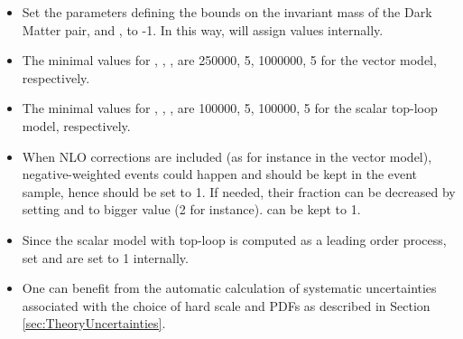 \begin{itemize}
\item Set the parameters defining the bounds on the invariant mass of the Dark Matter pair, \masslow and \masshigh, to -1. In this way, \powheg will assign values internally. 
\item The minimal values for \ncallOne, \itmxOne, \ncallTwo, \itmxTwo are 250000, 5, 1000000, 5 for the vector model, respectively.
\item The minimal values for \ncallOne, \itmxOne, \ncallTwo, \itmxTwo are 100000, 5, 100000, 5 for the scalar top-loop model, respectively.
\item When NLO corrections are included (as for instance in the
  vector model), negative-weighted events could happen and should
  be kept in the event sample, hence \withnegweights should be set to
  1. If needed, their fraction can be decreased by setting \foldsci
  and \foldy to bigger value (2 for instance). \foldphi can be kept to
  1.
\item Since the scalar model with top-loop is computed as a leading order process, set \LOevents and \bornonly are set to 1 internally.
\item One can benefit from the automatic calculation of systematic uncertainties associated with the choice of hard scale and PDFs as described in Section\,\ref{sec:TheoryUncertainties}.

\end{itemize}





